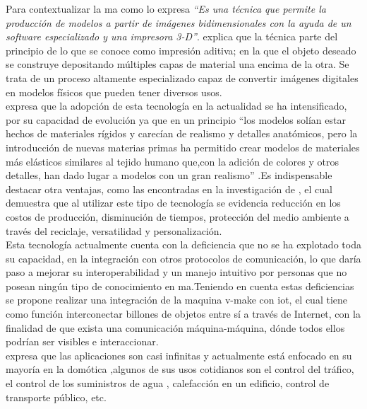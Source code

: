 Para contextualizar la \acrshort{ma} como lo expresa \cite{heinze} \textit{“Es una técnica que permite la producción de modelos a partir de imágenes bidimensionales con la ayuda de un software   especializado   y   una   impresora   3-D”}. \citep{blaquez}  explica que la técnica parte del principio de lo que se conoce como impresión aditiva; en la que el objeto deseado se construye depositando múltiples capas de material una encima de la otra. Se trata de un proceso altamente especializado capaz de convertir imágenes digitales en modelos físicos que pueden tener diversos usos. \\

\citep{chen} expresa que la adopción de esta tecnología en la actualidad se ha intensificado, por su capacidad de evolución ya que en un principio “los modelos solían estar hechos de materiales rígidos y carecían de realismo y detalles anatómicos, pero la introducción de nuevas materias primas ha permitido crear modelos de materiales más elásticos similares al tejido humano que,con la adición de colores y otros detalles, han dado lugar a modelos con un gran realismo” .Es indispensable destacar otra ventajas, como las encontradas en la investigación de \citep{reyes}, el cual demuestra que al utilizar este tipo de tecnología se evidencia reducción en los costos de producción, disminución de tiempos, protección del medio ambiente a través del reciclaje, versatilidad y personalización. \\


Esta tecnología actualmente cuenta con la deficiencia que no se ha explotado toda su capacidad, en la integración con otros protocolos de comunicación, lo que daría paso a mejorar su interoperabilidad y un manejo intuitivo por personas que no posean ningún tipo de conocimiento en \acrshort{ma}.Teniendo en cuenta estas deficiencias se propone realizar una integración de la maquina v-make con \acrshort{iot}, el cual tiene como función interconectar billones de objetos entre sí a través de Internet, con la finalidad de que exista una comunicación máquina-máquina, dónde todos ellos podrían ser visibles e interaccionar.\\

\citep{cristian} expresa que las aplicaciones son casi infinitas y actualmente está enfocado en su mayoría en la domótica ,algunos de sus usos cotidianos son el control del tráfico, el control de los suministros de agua , calefacción en un edificio,  control de transporte público, etc.\\

